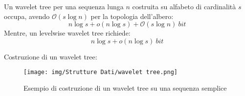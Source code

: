 Un wavelet tree per una sequenza lunga $n$ costruita su alfabeto di cardinalità
$s$ occupa, avendo $\mathcal{O}(s \log n)$ per la topologia dell'albero:
\begin{equation}
    n \log s + o(n \log s) + \mathcal{O}(s \log n) \ bit
\end{equation}
Mentre, un levelwise wavelet tree richiede:
\begin{equation}
    n \log s + o(n \log s) \ bit
\end{equation}
\begin{esempio}
    Costruzione di un wavelet tree:
    \begin{figure}[!ht]
        \centering
        \texttt{[image: img/Strutture Dati/wavelet tree.png]}
        \caption{Esempio di costruzione di un wavelet tree su una sequenza semplice}
    \end{figure}
\end{esempio}
